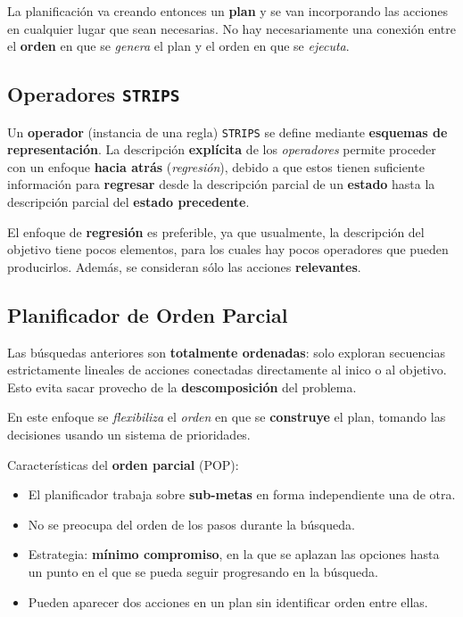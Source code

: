 \documentclass[10pt,a4paper]{article}
\begin{document}
La planificación va creando entonces un \textbf{plan} y se van incorporando las acciones en cualquier lugar que sean necesarias. No hay necesariamente una conexión entre el \textbf{orden} en que se \textit{genera} el plan y el orden en que se \textit{ejecuta}.

\subsection{Operadores \texttt{STRIPS}}

Un \textbf{operador} (instancia de una regla) \texttt{STRIPS} se define mediante \textbf{esquemas de representación}. La descripción \textbf{explícita} de los \textit{operadores} permite proceder con un enfoque \textbf{hacia atrás} (\textit{regresión}), debido a que estos tienen suficiente información para \textbf{regresar} desde la descripción parcial de un \textbf{estado} hasta la descripción parcial del \textbf{estado precedente}.

El enfoque de \textbf{regresión} es preferible, ya que usualmente, la descripción del objetivo tiene pocos elementos, para los cuales hay pocos operadores que pueden producirlos. Además, se consideran sólo las acciones \textbf{relevantes}.

\subsection{Planificador de Orden Parcial}

Las búsquedas anteriores son \textbf{totalmente ordenadas}: solo exploran secuencias estrictamente lineales de acciones conectadas directamente al inico o al objetivo. Esto evita sacar provecho de la \textbf{descomposición} del problema.

En este enfoque se \textit{flexibiliza} el \textit{orden} en que se \textbf{construye} el plan, tomando las decisiones usando un sistema de prioridades.

Características del \textbf{orden parcial} (POP):
\begin{itemize}
\item El planificador trabaja sobre \textbf{sub-metas} en forma independiente una de otra.
\item No se preocupa del orden de los pasos durante la búsqueda.
\item Estrategia: \textbf{mínimo compromiso}, en la que se aplazan las opciones hasta un punto en el que se pueda seguir progresando en la búsqueda.
\item Pueden aparecer dos acciones en un plan sin identificar orden entre ellas.
\end{itemize}
\end{document}
